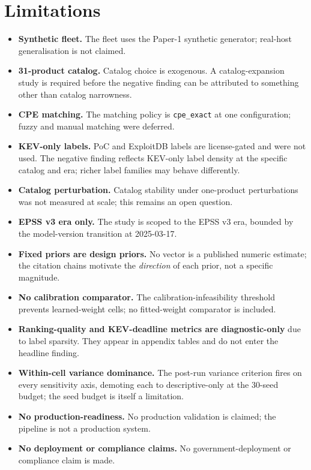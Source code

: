 \section{Limitations}
\begin{itemize}
 \item \textbf{Synthetic fleet.} The fleet uses the Paper-1 synthetic generator; real-host generalisation is not claimed.
 \item \textbf{31-product catalog.} Catalog choice is exogenous. A catalog-expansion study is required before the negative finding can be attributed to something other than catalog narrowness.
 \item \textbf{CPE matching.} The matching policy is \texttt{cpe\_exact} at one configuration; fuzzy and manual matching were deferred.
 \item \textbf{KEV-only labels.} PoC and ExploitDB labels are license-gated and were not used. The negative finding reflects KEV-only label density at the specific catalog and era; richer label families may behave differently.
 \item \textbf{Catalog perturbation.} Catalog stability under one-product perturbations was not measured at scale; this remains an open question.
 \item \textbf{EPSS v3 era only.} The study is scoped to the EPSS v3 era, bounded by the model-version transition at 2025-03-17.
 \item \textbf{Fixed priors are design priors.} No vector is a published numeric estimate; the citation chains motivate the \emph{direction} of each prior, not a specific magnitude.
 \item \textbf{No calibration comparator.} The calibration-infeasibility threshold prevents learned-weight cells; no fitted-weight comparator is included.
 \item \textbf{Ranking-quality and KEV-deadline metrics are diagnostic-only} due to label sparsity. They appear in appendix tables and do not enter the headline finding.
 \item \textbf{Within-cell variance dominance.} The post-run variance criterion fires on every sensitivity axis, demoting each to descriptive-only at the 30-seed budget; the seed budget is itself a limitation.
 \item \textbf{No production-readiness.} No production validation is claimed; the pipeline is not a production system.
 \item \textbf{No deployment or compliance claims.} No government-deployment or compliance claim is made.
\end{itemize}
